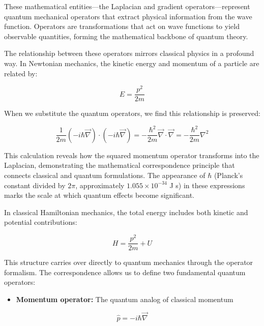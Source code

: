 \documentclass[italian]{HKNdocument}
\begin{document}
These mathematical entities—the Laplacian and gradient operators—represent quantum mechanical operators that extract physical information from the wave function. Operators are transformations that act on wave functions to yield observable quantities, forming the mathematical backbone of quantum theory.

The relationship between these operators mirrors classical physics in a profound way. In Newtonian mechanics, the kinetic energy and momentum of a particle are related by:

\begin{equation*}
E=\frac{p^{2}}{2 m} \tag{1.10}
\end{equation*}

When we substitute the quantum operators, we find this relationship is preserved:

\begin{equation*}
\frac{1}{2 m}(-i \hbar \vec{\nabla}) \cdot(-i \hbar \vec{\nabla})=-\frac{\hbar^{2}}{2 m} \vec{\nabla} \cdot \vec{\nabla}=-\frac{\hbar^{2}}{2 m} \nabla^{2} \tag{1.11}
\end{equation*}

This calculation reveals how the squared momentum operator transforms into the Laplacian, demonstrating the mathematical correspondence principle that connects classical and quantum formulations. The appearance of $\hbar$ (Planck's constant divided by $2\pi$, approximately $1.055 \times 10^{-34}$ J s) in these expressions marks the scale at which quantum effects become significant.

In classical Hamiltonian mechanics, the total energy includes both kinetic and potential contributions:

\begin{equation*}
H=\frac{p^{2}}{2 m}+U \tag{1.12}
\end{equation*}

This structure carries over directly to quantum mechanics through the operator formalism. The correspondence allows us to define two fundamental quantum operators:

\begin{itemize}
  \item \textbf{Momentum operator:} The quantum analog of classical momentum
\end{itemize}

\begin{equation*}
\hat{p}=-i \hbar \vec{\nabla} \tag{1.13}
\end{equation*}
\end{document}
